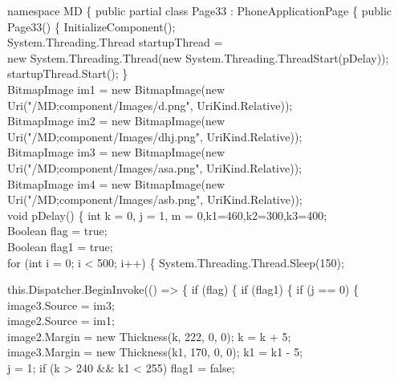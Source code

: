 {{namespace MD
\{
    public partial class Page33 : PhoneApplicationPage
    \{
        public Page33()
        \{
            InitializeComponent();\\
            System.Threading.Thread startupThread =\\
                          new System.Threading.Thread(new System.Threading.ThreadStart(pDelay));\\
            startupThread.Start();
        \}\\
        BitmapImage im1 = new BitmapImage(new Uri("/MD;component/Images/d.png", UriKind.Relative));\\
        BitmapImage im2 = new BitmapImage(new Uri("/MD;component/Images/dhj.png", UriKind.Relative));\\
        BitmapImage im3 = new BitmapImage(new Uri("/MD;component/Images/asa.png", UriKind.Relative));\\
        BitmapImage im4 = new BitmapImage(new Uri("/MD;component/Images/asb.png", UriKind.Relative));\\
        void pDelay()
        \{
            int k = 0, j = 1, m = 0,k1=460,k2=300,k3=400;\\
            Boolean flag = true;\\
            Boolean flag1 = true;\\
            for (int i = 0; i < 500; i++)
            \{
                System.Threading.Thread.Sleep(150);

                this.Dispatcher.BeginInvoke(() =>
                \{
                    if (flag)
                    \{
                        if (flag1)
                        \{
                            if (j == 0)
                            \{
                                image3.Source = im3;\\
                                image2.Source = im1;\\
                                image2.Margin = new Thickness(k, 222, 0, 0); k = k + 5;\\
                                image3.Margin = new Thickness(k1, 170, 0, 0); k1 = k1 - 5;\\
                                j = 1;
                                if (k > 240 && k1 < 255)
                                    flag1 = false;

}}
